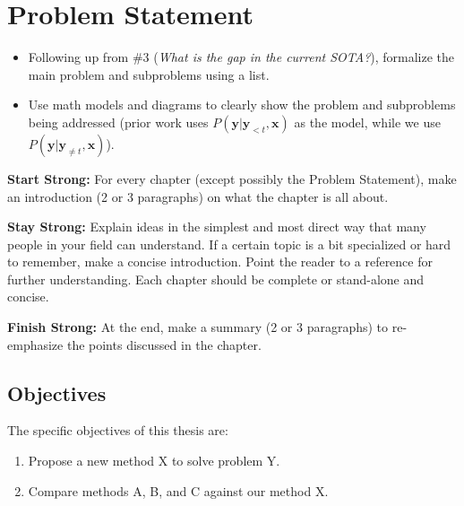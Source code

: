 \chapter{Problem Statement}
\label{ch:problem-statement}

\begin{itemize}
    \item Following up from \#3 (\emph{What is the gap in the current SOTA?}), formalize the main problem and subproblems using a list.
    \item Use math models and diagrams to clearly show the problem and subproblems being addressed (\eg prior work uses $P(\mathbf{y} | \mathbf{y}_{<t}, \mathbf{x})$ as the model, while we use $P(\mathbf{y} | \mathbf{y}_{\neq t}, \mathbf{x})$).
\end{itemize}

\textbf{Start Strong:} For every chapter (except possibly the Problem Statement), make an introduction (2 or 3 paragraphs) on what the chapter is all about.

\textbf{Stay Strong:} Explain ideas in the simplest and most direct way that many people in your field can understand. If a certain topic is a bit specialized or hard to remember, make a concise introduction. Point the reader to a reference for further understanding. Each chapter should be complete or stand-alone and concise.

\textbf{Finish Strong:} At the end, make a summary (2 or 3 paragraphs) to re-emphasize the points discussed in the chapter.

\section{Objectives}

The specific objectives of this thesis are:
\begin{enumerate}
    \item Propose a new method X to solve problem Y.
    \item Compare methods A, B, and C against our method X.
\end{enumerate}
